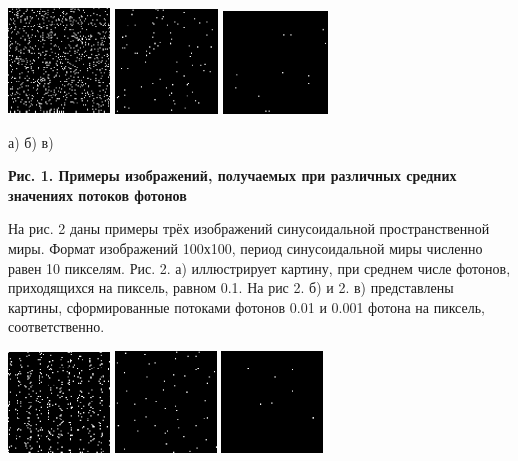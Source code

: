 \documentclass[11pt]{article}
\begin{document}
\includegraphics[width=0.25\linewidth]{1.png}
\includegraphics[width=0.255\linewidth]{2.png}
\includegraphics[width=0.267\linewidth]{3.png}

\qquad  \qquad  а)  \qquad  \qquad \qquad  \qquad \quad б)  \qquad  \qquad  \qquad  \qquad  в)

\begin{center}
\textbf{Рис. 1. Примеры изображений, получаемых при различных средних
значениях потоков фотонов}
\end{center}

На рис. 2 даны примеры трёх изображений синусоидальной пространственной
миры. Формат изображений 100х100, период синусоидальной миры численно равен 10 пикселям. Рис. 2. а) иллюстрирует картину, при среднем числе фотонов, приходящихся на пиксель, равном 0.1. На рис 2. б) и 2. в) представлены картины, сформированные потоками фотонов 0.01 и 0.001 фотона на пиксель, соответственно.

\includegraphics[width=0.252\linewidth]{4.png}
\includegraphics[width=0.249\linewidth]{5.png}
\includegraphics[width=0.25\linewidth]{6.png}
\end{document}
